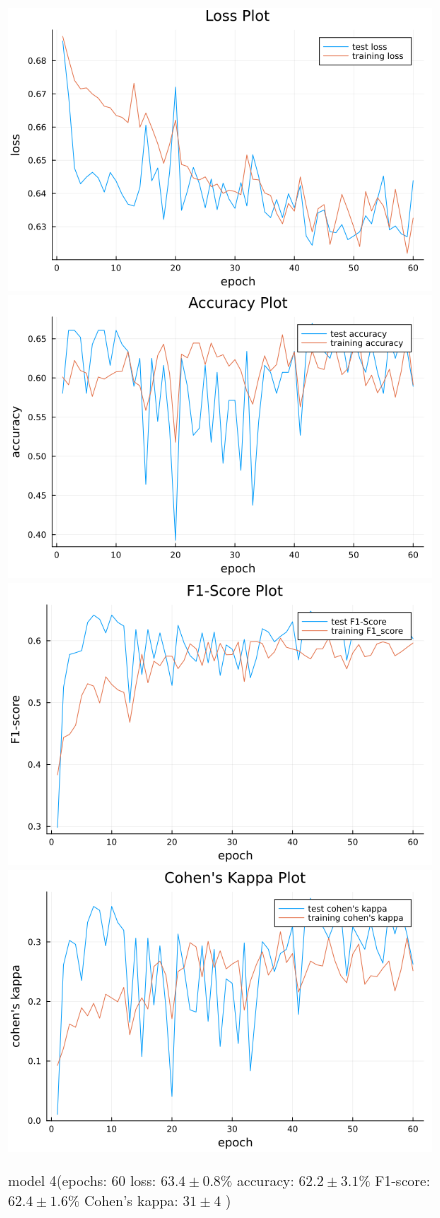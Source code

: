 \documentclass[
a4paper, 
12pt,
grayscalebody, %
abstract=on,
twoside, BCOR10mm, 12pt, DIV13,headinclude, footexclude, final, abstracton, openright
]{ibireprt}
\numberwithin{equation}{chapter}
\numberwithin{table}{chapter}
\numberwithin{figure}{chapter}
\numberwithin{algorithm}{chapter}
\numberwithin{example}{chapter}
\numberwithin{example}{chapter}
\begin{document}
\begin{figure}
	\includegraphics[width=0.4\linewidth]{loss_png_final_1_4.png}\hfill
	\includegraphics[width=0.4\linewidth]{accuracy_png_final_1_4.png}
	\\[\smallskipamount]
	\includegraphics[width=0.4\linewidth]{f1_score_png_final_1_4.png}\hfill
	\includegraphics[width=0.4\linewidth]{cohens_kappa_png_final_1_4.png}
	\caption{model 4(epochs: 60 loss: $63.4\pm0.8\% $ accuracy: $62.2\pm3.1\%$ F1-score: $62.4\pm1.6\%$  Cohen's kappa: $31\pm4$ )}
	\label{fig:model_4_60}
\end{figure}
\end{document}
